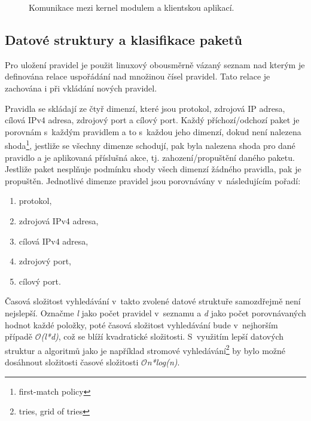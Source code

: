 \documentclass[10pt,a4paper,notitlepage]{article}
\newcommand{\bigO}{\ensuremath{\mathcal{O}}}%
\begin{document}
\begin{figure}[h]	%
\centering %
\caption{Komunikace mezi kernel modulem a klientskou aplikací.}
\label{pic:2}
\end{figure}

\subsection{Datové struktury a klasifikace paketů}
Pro uložení pravidel je použit linuxový obousměrně vázaný seznam nad kterým je
definována relace uspořádání nad množinou čísel pravidel. Tato relace je
zachována i při vkládání nových pravidel.

Pravidla se skládají ze čtyř dimenzí, které jsou protokol, zdrojová IP adresa,
cílová IPv4 adresa, zdrojový port a cílový port. Každý příchozí/odchozí paket je
porovnám s~každým pravidlem a to s~každou jeho dimenzí, dokud není nalezena
shoda\footnote{first-match policy}, jestliže se všechny
dimenze schodují, pak byla nalezena shoda pro dané pravidlo a je aplikovaná
příslušná akce, tj. zahození/propuštění daného paketu. Jestliže paket nesplňuje
podmínku shody všech dimenzí žádného pravidla, pak je propuštěn. Jednotlivé
dimenze pravidel jsou porovnávány v~následujícím pořadí:

\begin{enumerate}
  \item protokol,
  \item zdrojová IPv4 adresa,
  \item cílová IPv4 adresa,
  \item zdrojový port,
  \item cílový port.
\end{enumerate}

Časová složitost vyhledávání v~takto zvolené datové struktuře samozdřejmě není
nejslepší. Označme \textit{l} jako počet pravidel v~seznamu a \textit{d} jako
počet porovnávaných hodnot každé položky, poté časová složitost vyhledávání bude
v~nejhorším případě \bigO \textit{(l*d)}, což se blíží kvadratické složitosti.
S~využitím lepší datových struktur a algoritmů jako je například stromové
vyhledávání\footnote{tries, grid of tries} by bylo možné dosáhnout složitosti
časové složitosti \bigO \textit{n*log(n)}.
\end{document}
